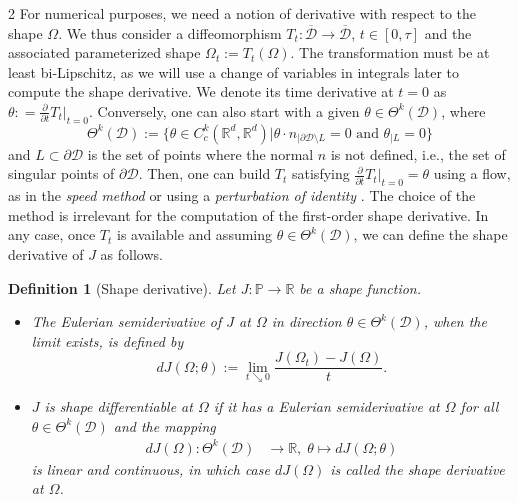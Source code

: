 \documentclass[a4paper, oneside]{article}
\newcommand{\hold}{\mathcal{D}}
\newcommand{\Om}{\Omega}
\newcommand{\VV}{\theta}
\newcommand{\R}{\mathds{R}}
\newcommand{\singset}{L}
\newtheorem{definition}{Definition}
\begin{document}
\begin{multicols}{2}
For numerical purposes, we need a notion of derivative with respect to the shape $\Om$.
We thus consider a diffeomorphism $T_t:\overline{\hold}\to\overline{\hold}$, $t\in [0,\tau]$ and the associated parameterized shape $\Om_t := T_t(\Om)$.
The transformation must be at least bi-Lipschitz, as we will use a change of variables in integrals later to compute the shape derivative.
We denote its time derivative at $t=0$ as $\VV: = \frac{\partial}{\partial t} T_t|_{t=0}$.
Conversely, one can also start with a given $\VV\in\Theta^k(\hold)$, where
$$ \Theta^k(\hold) := \{\VV\in C^k_c(\R^d,\R^d)| \VV\cdot n_{|\partial\hold\setminus \singset} = 0 \mbox{ and } \VV_{|\singset} = 0\}$$
and $\singset\subset\partial\hold$ is the set of points where the normal $n$ is not defined, i.e., the set of singular points of $\partial\hold$.
Then, one can build $T_t$ satisfying $\frac{\partial}{\partial t} T_t|_{t=0} = \VV$ using a flow, as in the {\it speed method}
\cite{MR2731611,SokZol92} or using a {\it perturbation of identity} \cite{MR2512810}.
The choice of the method is irrelevant for the computation of the first-order shape derivative.
In any case, once $T_t$ is available and assuming  $\VV\in\Theta^k(\hold)$, we can define the shape derivative of $J$ as follows.
\begin{definition}[Shape derivative]\label{def1}
	Let $J : \mathds{P} \rightarrow \R$ be a shape function.
	\begin{itemize}
	\item[(i)] The Eulerian semiderivative of $J$ at $\Omega$ in direction $\theta \in \Theta^k(\hold)$, when the limit exists,
	is defined by
	\begin{equation}
	dJ(\Omega ;\VV):= \lim_{t \searrow 0}\frac{J(\Omega_t)-J(\Omega)}{t}.
	\end{equation}
	\item[(ii)] $J$ is  \textit{shape differentiable} at $\Omega$ if it has a Eulerian semiderivative at $\Omega$ for all $\theta \in \Theta^k(\hold)$ and the mapping
	\begin{align*}
	dJ(\Omega): \Theta^k(\hold) &  \to \R,\; \VV     \mapsto dJ(\Omega ;\VV)
	\end{align*}
	is linear and continuous, in which case $dJ(\Omega)$ is called the \textit{shape derivative} at $\Omega$.
	\end{itemize}
	\end{definition}

\end{multicols}
\end{document}
